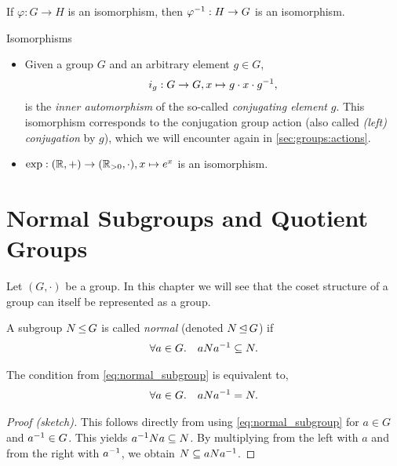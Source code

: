 \begin{rmk}
If $\varphi : G \to H$ is an isomorphism, then $\varphi^{-1} : H \to G$ is an isomorphism.
\end{rmk}

\begin{ex}{Isomorphisms}{}
\begin{itemize}
    \item Given a group $G$ and an arbitrary element $g \in G$, \begin{align}
        i_g : G \to G, x \mapsto g \cdot x \cdot g^{-1},
    \end{align} is the \emph{inner automorphism} of the so-called \emph{conjugating element} $g$. This isomorphism corresponds to the conjugation group action (also called \emph{(left) conjugation} by $g$), which we will encounter again in \cref{sec:groups:actions}.
    
    \item $\exp : (\mathbb{R},+) \to (\mathbb{R}_{>0},\cdot), x \mapsto e^x$ is an isomorphism.
\end{itemize}
\end{ex}

\chapter{Normal Subgroups and Quotient Groups}
Let $(G,\cdot)$ be a group. In this chapter we will see that the coset structure of a group can itself be represented as a group.

\begin{defn}
A subgroup $N \operatorname*{\leq} G$ is called \emph{normal} (denoted $N \operatorname*{\trianglelefteq} G$) if \begin{align}
    \forall a \in G.\quad a N a^{-1} \subseteq N. \label{eq:normal_subgroup}
\end{align}
\end{defn}

\begin{rmk}\label{rmk:normal_subgroup}
The condition from \cref{eq:normal_subgroup} is equivalent to, \begin{align}
    \forall a \in G.\quad a N a^{-1} = N.
\end{align}
\end{rmk} \begin{proof}[Proof (sketch)]
This follows directly from using \cref{eq:normal_subgroup} for $a \in G$ and $a^{-1} \in G$. This yields $a^{-1} N a \subseteq N$. By multiplying from the left with $a$ and from the right with $a^{-1}$, we obtain $N \subseteq a N a^{-1}$.
\end{proof}

